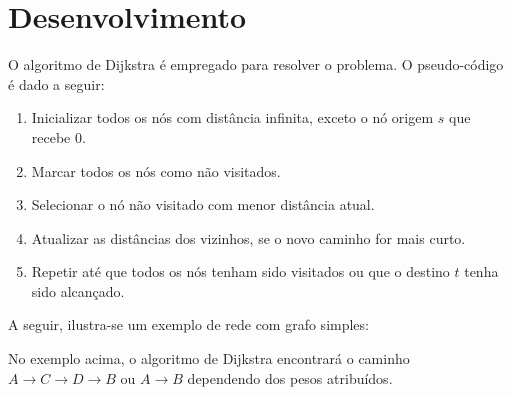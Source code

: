 \section{Desenvolvimento} \label{sec:algorithm}

O algoritmo de Dijkstra é empregado para resolver o problema.
O pseudo-código é dado a seguir:

\begin{enumerate}
    \item Inicializar todos os nós com distância infinita, exceto o nó origem $s$ que recebe 0.
    \item Marcar todos os nós como não visitados.
    \item Selecionar o nó não visitado com menor distância atual.
    \item Atualizar as distâncias dos vizinhos, se o novo caminho for mais curto.
    \item Repetir até que todos os nós tenham sido visitados ou que o destino $t$ tenha sido alcançado.
\end{enumerate}

A seguir, ilustra-se um exemplo de rede com grafo simples:

\begin{center}
\end{center}

No exemplo acima, o algoritmo de Dijkstra encontrará o caminho $A \rightarrow C \rightarrow D \rightarrow B$ ou $A \rightarrow B$ dependendo dos pesos atribuídos.
